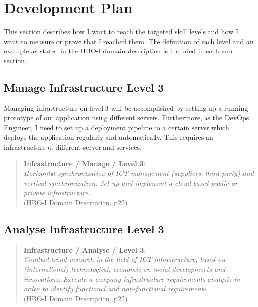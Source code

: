 
\section{Development Plan}
\label{sec:development}

This section describes how I want to reach the targeted skill levels and how I want to measure or prove that I reached them.
The definition of each level and an example as stated in the HBO-I domain description is included in each sub section.


\subsection{Manage Infrastructure Level 3}

Managing infrastructure on level 3 will be accomplished by setting up a running prototype of our application using different servers.
Furthermore, as the DevOps Engineer, I need to set up a deployment pipeline to a certain server which deploys the application regularly and automatically. This requires an infrastructure of different server and services.

\begin{quote}
	\textbf{Infrastructure / Manage / Level 3}: \\
	\textit{
		Horizontal synchronization of ICT management (suppliers, third-party) and vertical synchronization.
		Set up and implement a cloud-based public or private infrastructure.
	} \\ (HBO-I Domain Description, p22)
\end{quote}


\subsection{Analyse Infrastructure Level 3}



\begin{quote}
	\textbf{Infrastructure / Analyse / Level 3}: \\
	\textit{
		Conduct trend research in the field of ICT infrastructure, based on (international) technological, economic en social developments and innovations. 
		Execute a company infrastructure requirements analysis in order to identify functional and non-functional requirements.
	} \\ (HBO-I Domain Description, p22)
\end{quote}


